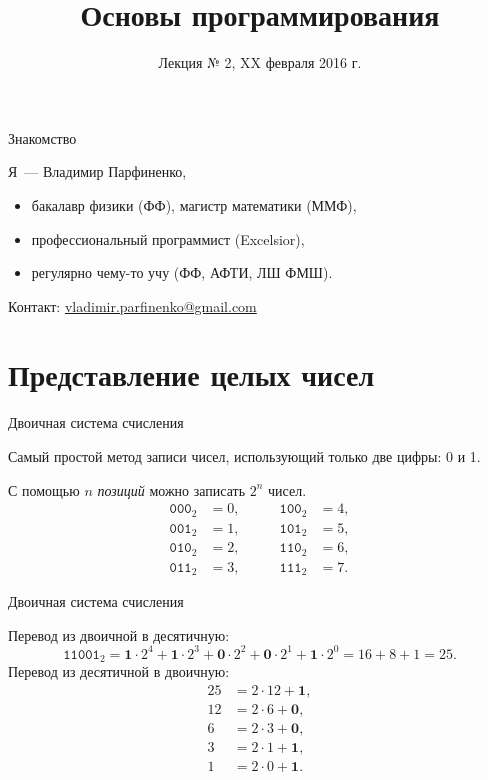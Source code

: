 \documentclass{beamer}
\title{Основы программирования}
\subtitle{Лекция № 2, XX февраля 2016 г.}
\date{}
\institute{
  \vspace{1em}
  \centering
  \parbox{0.8\textwidth}{
    \texttt{[image: xkcd\_cant\_sleep]}
    \par
    \raggedleft\tiny\url{http://xkcd.com/571}
  }
}
\newcommand{\pcnum}[1]{\ensuremath{\mathtt{#1}}}
\newcommand{\bin}[1]{\pcnum{#1}_2}
\begin{document}
\begin{frame}[plain]
  \titlepage
\end{frame}

\begin{frame}{Знакомство}

  Я~--- Владимир Парфиненко,

  \begin{itemize}
    \item бакалавр физики (ФФ), магистр математики (ММФ),
    \item профессиональный программист (Excelsior),
    \item регулярно чему-то учу (ФФ, АФТИ, ЛШ ФМШ).
  \end{itemize}

  Контакт:
  \href{mailto:vladimir.parfinenko@gmail.com}{vladimir.parfinenko@gmail.com}

\end{frame}

\section{Представление целых чисел}

\begin{frame}{Двоичная система счисления}

  Самый простой метод записи чисел, использующий только две цифры: 0 и 1.

  С помощью $n$ \emph{позиций} можно записать $2^n$ чисел.
  \begin{align*}
    \bin{000} &= 0, &\qquad \bin{100} &= 4, \\
    \bin{001} &= 1, &\qquad \bin{101} &= 5, \\
    \bin{010} &= 2, &\qquad \bin{110} &= 6, \\
    \bin{011} &= 3, &\qquad \bin{111} &= 7.
  \end{align*}
\end{frame}

\begin{frame}{Двоичная система счисления}

  Перевод из двоичной в десятичную:
  \[
    \bin{11001} = \mathbf{1} \cdot 2^4 + \mathbf{1} \cdot 2^3 +
                  \mathbf{0} \cdot 2^2 + \mathbf{0} \cdot 2^1 +
                  \mathbf{1} \cdot 2^0 = 16 + 8 + 1 = 25.
  \]
  Перевод из десятичной в двоичную:
  \begin{align*}
    25 &= 2 \cdot 12 + \mathbf{1}, \\
    12 &= 2 \cdot 6 + \mathbf{0}, \\
    6 &= 2 \cdot 3 + \mathbf{0}, \\
    3 &= 2 \cdot 1 + \mathbf{1}, \\
    1 &= 2 \cdot 0 + \mathbf{1}.
  \end{align*}

\end{frame}
\end{document}
